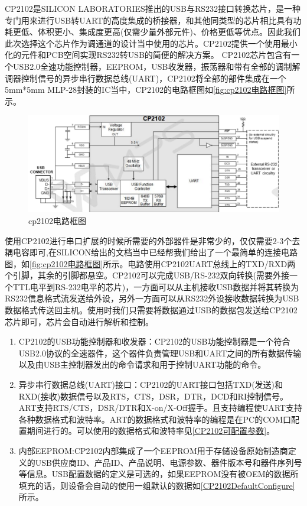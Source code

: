 	CP2102是SILICON LABORATORIES推出的USB与RS232接口转换芯片，是一种专门用来进行USB转UART的高度集成的桥接器，和其他同类型的芯片相比具有功耗更低、体积更小、集成度更高(仅需少量外部元件)、价格更低等优点。因此我们此次选择这个芯片作为调通道的设计当中使用的芯片。CP2102提供一个使用最小化的元件和PCB空间实现RS232转USB的简便的解决方案。
	CP2102芯片包含有一个USB2.0全速功能控制器，EEPROM，USB收发器，振荡器和带有全部的调制解调器控制信号的异步串行数据总线(UART)，CP2102将全部的部件集成在一个5mm*5mm MLP-28封装的IC当中\cite{CP2102}，CP2102的电路框图如\autoref{fig:cp2102电路框图}所示。

\begin{figure}[!h]
\centering
\includegraphics[width=1.0\textwidth]{./graphics/cp2102-circuit-diagram.pdf}
\caption{cp2102电路框图}\label{fig:cp2102电路框图}
\end{figure}

	使用CP2102进行串口扩展的时候所需要的外部器件是非常少的，仅仅需要2-3个去耦电容即可,在SILICON给出的文档当中已经帮我们给出了一个最简单的连接电路图，如\autoref{fig:cp2102电路框图}所示。电路使用CP2102UART总线上的TXD/RXD两个引脚，其余的引脚都悬空。CP2102可以完成USB/RS-232双向转换(需要外接一个TTL电平到RS-232电平的芯片)，一方面可以从主机接收USB数据并将其转换为RS232信息格式流发送给外设，另外一方面可以从RS232外设接收数据转换为USB数据格式传送回主机。使用时我们只需要将数据通过USB的数据包发送给CP2102芯片即可，芯片会自动进行解析和控制。
		
\begin{enumerate}
\item CP2102的USB功能控制器和收发器：CP2102的USB功能控制器是一个符合USB2.0协议的全速器件，这个器件负责管理USB和UART之间的所有数据传输以及由USB主控制器发出的命令请求和用于控制UART功能的命令。
\item 异步串行数据总线(UART)接口：CP2102的UART接口包括TXD(发送)和RXD(接收)数据信号以及RTS，CTS，DSR，DTR，DCD和RI控制信号。ART支持RTS/CTS，DSR/DTR和X-on/X-Off握手。且支持编程使UART支持各种数据格式和波特率。ART的数据格式和波特率的编程是在PC的COM口配置期间进行的。可以使用的数据格式和波特率见\autoref{CP2102可配置参数}。
\item 内部EEPROM:CP2102内部集成了一个EEPROM用于存储设备原始制造商定义的USB供应商ID、产品ID、产品说明、电源参数、器件版本号和器件序列号等信息\cite{CP2102}。USB配置数据的定义是可选的，如果EEPROM没有被OEM的数据所填充的话，则设备会自动的使用一组默认的数据如\autoref{CP2102DefaultConfigure}所示。
\end{enumerate}


